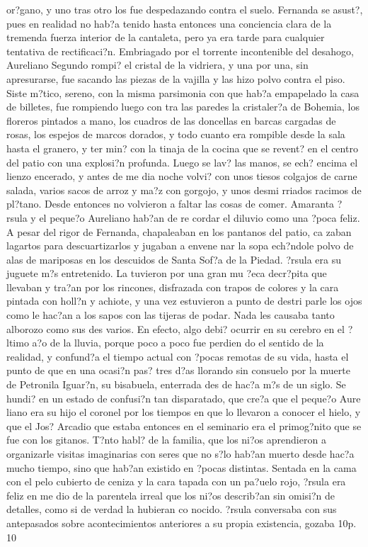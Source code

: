 or?gano, y uno tras otro los fue despedazando contra el suelo. Fernanda se asust?, pues en realidad no hab?a tenido hasta entonces una conciencia clara de la tremenda fuerza interior de la cantaleta, pero ya era tarde para cualquier tentativa de rectificaci?n. Embriagado por el torrente incontenible del desahogo, Aureliano Segundo rompi? el cristal de la vidriera, y una por una, sin apresurarse, fue sacando las piezas de la vajilla y las hizo polvo contra el piso. Siste m?tico, sereno, con la misma parsimonia con que hab?a empapelado la casa de billetes, fue rompiendo luego con tra las paredes la cristaler?a de Bohemia, los floreros pintados a mano, los cuadros de las doncellas en barcas cargadas de rosas, los espejos de marcos dorados, y todo cuanto era rompible desde la sala hasta el granero, y ter min? con la tinaja de la cocina que se revent? en el centro del patio con una explosi?n profunda. Luego se lav? las manos, se ech? encima el lienzo encerado, y antes de me dia noche volvi? con unos tiesos colgajos de carne salada, varios sacos de arroz y ma?z con gorgojo, y unos desmi rriados racimos de pl?tano. Desde entonces no volvieron a faltar las cosas de comer. Amaranta ?rsula y el peque?o Aureliano hab?an de re cordar el diluvio como una ?poca feliz. A pesar del rigor de Fernanda, chapaleaban en los pantanos del patio, ca zaban lagartos para descuartizarlos y jugaban a envene nar la sopa ech?ndole polvo de alas de mariposas en los descuidos de Santa Sof?a de la Piedad. ?rsula era su juguete m?s entretenido. La tuvieron por una gran mu ?eca decr?pita que llevaban y tra?an por los rincones, disfrazada con trapos de colores y la cara pintada con holl?n y achiote, y una vez estuvieron a punto de destri parle los ojos como le hac?an a los sapos con las tijeras de podar. Nada les causaba tanto alborozo como sus des varios. En efecto, algo debi? ocurrir en su cerebro en el ?ltimo a?o de la lluvia, porque poco a poco fue perdien do el sentido de la realidad, y confund?a el tiempo actual con ?pocas remotas de su vida, hasta el punto de que en una ocasi?n pas? tres d?as llorando sin consuelo por la muerte de Petronila Iguar?n, su bisabuela, enterrada des de hac?a m?s de un siglo. Se hundi? en un estado de confusi?n tan disparatado, que cre?a que el peque?o Aure liano era su hijo el coronel por los tiempos en que lo llevaron a conocer el hielo, y que el Jos? Arcadio que estaba entonces en el seminario era el primog?nito que se fue con los gitanos. T?nto habl? de la familia, que los ni?os aprendieron a organizarle visitas imaginarias con seres que no s?lo hab?an muerto desde hac?a mucho tiempo, sino que hab?an existido en ?pocas distintas. Sentada en la cama con el pelo cubierto de ceniza y la cara tapada con un pa?uelo rojo, ?rsula era feliz en me dio de la parentela irreal que los ni?os describ?an sin omisi?n de detalles, como si de verdad la hubieran co nocido. ?rsula conversaba con sus antepasados sobre acontecimientos anteriores a su propia existencia, gozaba 10p. 10

